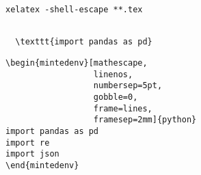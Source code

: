 \documentclass[a4paper]{ctexart}    %
\begin{document}
\begin{tcolorbox}[
         colback=red!5!white,
         colframe=teal,
         title=\textbf{minted compile order}
    ]
\begin{verbatim}
xelatex -shell-escape **.tex
\end{verbatim}
\end{tcolorbox}

\begin{tcolorbox}[
         colback=red!5!white,
         colframe=teal,
         title=\textbf{line code}
    ]
\begin{verbatim}

  \texttt{import pandas as pd}
\end{verbatim}
\end{tcolorbox}

\begin{tcolorbox}[
         colback=red!5!white,
         colframe=teal,
         title=\textbf{code env}
    ]
\begin{verbatim}
\begin{mintedenv}[mathescape,
                  linenos,
                  numbersep=5pt,
                  gobble=0,
                  frame=lines,
                  framesep=2mm]{python}
import pandas as pd
import re
import json
\end{mintedenv}
\end{verbatim}
\end{tcolorbox}
\end{document}
